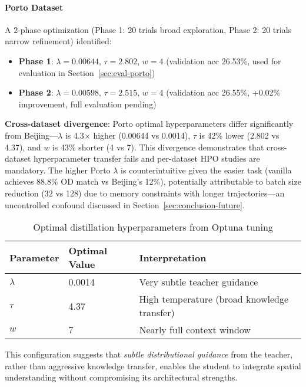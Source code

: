 \paragraph{Porto Dataset}
A 2-phase optimization (Phase 1: 20 trials broad exploration, Phase 2: 20 trials narrow refinement) identified:
\begin{itemize}[leftmargin=*,noitemsep]
    \item \textbf{Phase 1}: $\lambda = 0.00644$, $\tau = 2.802$, $w = 4$ (validation acc 26.53\%, used for evaluation in Section~\ref{sec:eval-porto})
    \item \textbf{Phase 2}: $\lambda = 0.00598$, $\tau = 2.515$, $w = 4$ (validation acc 26.55\%, +0.02\% improvement, full evaluation pending)
\end{itemize}

\textbf{Cross-dataset divergence}: Porto optimal hyperparameters differ significantly from Beijing---$\lambda$ is 4.3$\times$ higher (0.00644 vs 0.0014), $\tau$ is 42\% lower (2.802 vs 4.37), and $w$ is 43\% shorter (4 vs 7). This divergence demonstrates that cross-dataset hyperparameter transfer fails and per-dataset HPO studies are mandatory. The higher Porto $\lambda$ is counterintuitive given the easier task (vanilla achieves 88.8\% OD match vs Beijing's 12\%), potentially attributable to batch size reduction (32 vs 128) due to memory constraints with longer trajectories---an uncontrolled confound discussed in Section~\ref{sec:conclusion-future}.

\begin{table}[h]
    \centering
    \caption{Optimal distillation hyperparameters from Optuna tuning}
    \label{tab:optimal-hparams}
    \small
    \begin{tabular}{lll}
        \toprule
        \textbf{Parameter} & \textbf{Optimal Value} & \textbf{Interpretation}                     \\
        \midrule
        $\lambda$          & 0.0014                 & Very subtle teacher guidance                \\
        $\tau$             & 4.37                   & High temperature (broad knowledge transfer) \\
        $w$                & 7                      & Nearly full context window                  \\
        \bottomrule
    \end{tabular}
\end{table}

This configuration suggests that \emph{subtle distributional guidance} from the teacher, rather than aggressive knowledge transfer, enables the student to integrate spatial understanding without compromising its architectural strengths.

